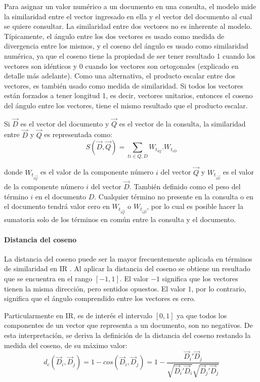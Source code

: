 \bigskip Para asignar un valor numérico a un documento en una consulta, el modelo mide la similaridad entre el vector ingresado en ella y el vector del documento al cual se quiere consultar. La similaridad entre dos vectores no es inherente al modelo. Típicamente, el ángulo entre los dos vectores es usado como medida de divergencia entre los mismos, y el coseno del ángulo es usado como similaridad numérica, ya que el coseno tiene la propiedad de ser tener resultado 1 cuando los vectores son idénticos y 0 cuando los vectores son ortogonales (explicado en detalle más adelante). Como una alternativa, el producto escalar entre dos vectores, es también usado como medida de similaridad. Si todos los vectores están forzados a tener longitud 1, es decir, vectores unitarios, entonces el coseno del ángulo entre los vectores, tiene el mismo resultado que el producto escalar.

\bigskip Si \(\overrightarrow{D}\) es el vector del documento y \(\overrightarrow{Q}\) es el vector de la consulta, la similaridad entre \(\overrightarrow{D}\) y \(\overrightarrow{Q}\) es representada como:
\[S(\vec{D},\vec{Q})=\sum_{ti \in Q,D}^{ }{W_{t_{iQ}}.W_{t_{iD}}}\]

donde \(W_{t_{i \overrightarrow{Q}}}\) es el valor de la componente número \(i\) del vector \(\overrightarrow{Q}\) y \(W_{t_{i \overrightarrow{D}}}\) es el valor de la componente número \(i\) del vector \(\overrightarrow{D}\). También definido como el peso del término \(i\) en el documento \(D\). Cualquier término no presente en la consulta o en el documento tendrá valor cero en \(W_{t_{i \overrightarrow{Q}}}\) o \(W_{t_{i \overrightarrow{D}}}\), por lo cual es posible hacer la sumatoria solo de los términos en común entre la consulta y el documento.

\paragraph{Distancia del coseno}
La distancia del coseno puede ser la mayor frecuentemente aplicada en términos de similaridad en IR \citep{korenius2007principal}. Al aplicar la distancia del coseno se obtiene un resultado que se encuentra en el rango \([-1, 1]\). El valor \(-1\) significa que los vectores tienen la misma dirección, pero sentidos opuestos. El valor \(1\), por lo contrario, significa que el ángulo comprendido entre los vectores es cero.

\bigskip Particularmente en IR, es de interés el intervalo \([0, 1]\) ya que todos los componentes de un vector que representa a un documento, son no negativos. De esta interpretación, se deriva la definición de la distancia del coseno restando la medida del coseno, de su máximo valor:
\[d_c(\vec{D}_i, \vec{D}_j) = 1 - cos(\vec{D}_i, \vec{D}_j) = 1 - \frac{{\vec{D}_i}'\vec{D}_j}{\sqrt{{\vec{D}_i}'\vec{D}_i}\sqrt{{\vec{D}_j}'\vec{D}_j}}\]

